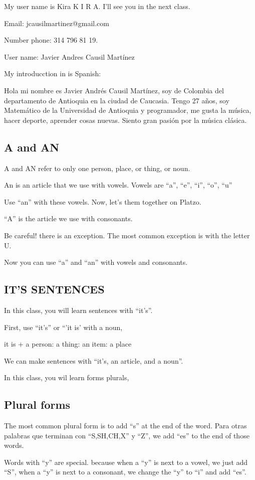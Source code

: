  My user name is Kira K I R A. I'll see you in the next class.
 
 
 Email: jcausilmartinez@gmail.com
 
 Number phone: 314 796 81 19.
 
 User name: Javier Andres Causil Martínez


My introducction in is Spanish:  

Hola mi nombre es Javier Andr\'es Causil Mart\'inez, soy de Colombia del departamento de Antioquia en la ciudad de Caucasia. Tengo 27 a\~nos, soy Matem\'atico  de la Universidad de Antioquia y programador, me gusta la m\'usica, hacer deporte, aprender cosas nuevas. Siento gran pasi\'on por la m\'usica cl\'asica. 



\subsection{A and AN}

A and AN refer to only one person, place, or thing, or noun.

An is an article that we use with vowels. Vowels are ``a'', ``e'', ``i'', ``o'', ``u''

Use ``an'' with these vowels. Now, let's them together on Platzo.

``A'' is the article we use with consonants.

Be careful! there is an exception. The most common exception is with the letter U.

Now you can use ``a'' and ``an'' with vowels and consonants.

\subsection{IT'S SENTENCES}

In this class, you will learn sentences with ``it's''.

First, use ``it's'' or ``'it is' with a noun, 

it is + a person: a thing: an item: a place

We can make sentences with ``it's, an article, and a noun''.

In this class, you wil learn forms plurals, 

\subsection{Plural forms}

The most common plural form is to add ``s'' at the end of the word. Para otras palabras que terminan con ``S,SH,CH,X'' y ``Z'', we add ``es'' to the end of those words.

Words with ``y'' are special. because when a ``y'' is next to a vowel, we just add ``S'', when a ``y'' is next to a consonant, we change the ``y'' to ``i'' and add ``es''.
